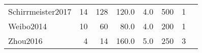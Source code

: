 \begin{tabularx}{\linewidth}{@{}Xrrrrrrr@{}}
	Schirrmeister2017          & 14              & 128      & 120.0           & 4.0 & 500  & 1                 & \cite{Schirrmeister2017} \\
	Weibo2014                  & 10              & 60       & 80.0            & 4.0 & 200  & 1                 & \cite{Yi2014}            \\
	Zhou2016                   & 4               & 14       & 160.0           & 5.0 & 250  & 3                 & \cite{Zhou2016}          \\
	\bottomrule
\end{tabularx}
